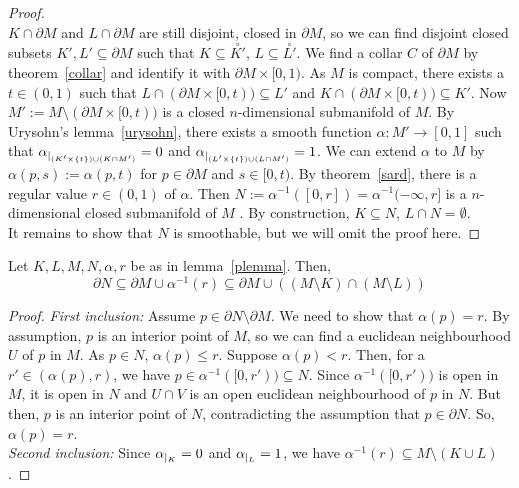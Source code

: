 \documentclass[a4paper,12pt]{article}
\begin{document}
\begin{proof}\cite{conner}\\
    \(K\cap\partial M\) and \(L\cap\partial M\) are still disjoint, closed in \(\partial M\), so we can find disjoint closed subsets \(K',L'\subseteq\partial M\) such that \(K\subseteq\overset{\circ}{K'}\), \(L\subseteq\overset{\circ}{L'}\). 
    We find a collar \(C\) of \(\partial M\) by theorem\ \ref{collar} and identify it with \(\partial M\times[0,1)\). 
    As \(M\) is compact, there exists a \(t\in (0,1)\) such that \(L\cap (\partial M\times [0,t))\subseteq L'\) and \(K\cap (\partial M\times [0,t))\subseteq K'\). 
    Now \(M':=M\setminus (\partial M\times [0,t))\) is a closed \(n\)-dimensional submanifold of \(M\). By Urysohn's lemma\ \ref{urysohn}, there exists a smooth function \(\alpha:M'\to[0,1]\) such that \(\alpha_{|_{(K'\times \{t\})\cup (K\cap M')}}=0\) and \(\alpha_{|_{(L'\times \{t\})\cup(L\cap M')}}=1\). 
    We can extend \(\alpha\) to \(M\) by \(\alpha(p,s):=\alpha(p,t)\) for \(p\in \partial M\) and \(s\in[0,t)\). 
    By theorem\ \ref{sard}, there is a regular value \(r\in(0,1)\) of \(\alpha\). 
    Then \(N:=\alpha^{-1}([0,r])=\alpha^{-1}(-\infty,r]\) is a \(n\)-dimensional closed submanifold of \(M\)%
    . By construction, \(K\subseteq N\), \(L\cap N=\emptyset\).\\
    It remains to show that \(N\) is smoothable, but we will omit the proof here.
\end{proof}


\begin{lemma}\label{plemma2}
    Let \(K,L,M,N,\alpha,r\) be as in lemma\ \ref{plemma}. Then,
    \[\partial N\subseteq \partial M\cup \alpha^{-1}(r)\subseteq \partial M\cup((M\setminus K)\cap(M\setminus L))\]
\end{lemma}

\begin{proof}\cite{zhang}
    \textit{First inclusion:} Assume \(p\in\partial N\setminus \partial M\). We need to show that \(\alpha(p)=r\). By assumption, \(p\) is an interior point of \(M\), so we can find a euclidean neighbourhood \(U\) of \(p\) in \(M\). 
    As \(p\in N\), \(\alpha(p)\leq r\). Suppose \(\alpha(p)<r\). Then, for a \(r'\in(\alpha(p),r)\), we have \(p\in\alpha^{-1}([0,r'))\subseteq N\). Since \(\alpha^{-1}([0,r'))\) is open in \(M\), it is open in \(N\) and \(U\cap V\) is an open euclidean neighbourhood of \(p\) in \(N\). But then, \(p\) is an interior point of \(N\), contradicting the assumption that \(p\in\partial N\). So, \(\alpha(p)=r\).\\
    \textit{Second inclusion:} Since \(\alpha_{|_{K}}=0\) and \(\alpha_{|_{L}}=1\), we have \(\alpha^{-1}(r)\subseteq M\setminus (K\cup L)\).
\end{proof}
\end{document}
